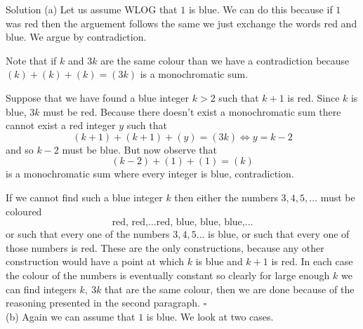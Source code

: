 \documentclass{article}
\begin{document}
\begin{solution}{Solution}
(a) Let us assume WLOG that $1$ is blue. We can do this because if $1$ was red
then the arguement follows the same we just exchange the words red and blue.
We argue by contradiction.
\vspace{0.2cm}

Note that if $k$ and $3k$ are the same colour than we have a contradiction
because $(k) + (k) + (k) = (3k)$ is a monochromatic sum.
\vspace{0.2cm}

Suppose that we have found a blue integer $k > 2$ such that $k + 1$ is red.
Since $k$ is blue, $3k$ must be red. Because there doesn't exist a
monochromatic sum there cannot exist a red integer $y$ such that
$$
(k+1) + (k+1) + (y) = (3k) \iff y = k - 2
$$
and so $k-2$ must be blue. But now observe that
$$
(k-2) + (1) + (1) = (k)
$$
is a monochromatic sum where every integer is blue, contradiction.
\vspace{0.2cm}

If we cannot find such a blue integer $k$ then either the numbers
$3,4,5,\ldots$ must be coloured
$$
\text{red, red,} \ldots \text{red, blue, blue, blue,} \ldots
$$
or such that every one of the numbers $3,4,5\ldots$ is blue, or such that
every one of those numbers is red. These are the only constructions,
because any other construction would have a point at which $k$ is blue
and $k+1$ is red.
In each case the colour
of the numbers is eventually constant so clearly for large enough $k$
we can find integers $k, \ 3k$ that are the same colour, then we are done
because of the reasoning presented in the second paragraph. $\square$
\\

(b) Again we can assume that $1$ is blue. We look at two cases.
\vspace{0.2cm}


\end{solution}
\end{document}
